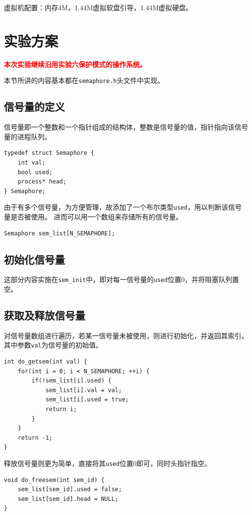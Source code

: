 \documentclass[logo,reportComp]{thesis}
\begin{document}
虚拟机配置：内存4M，1.44M虚拟软盘引导，1.44M虚拟硬盘。

\section{实验方案}
{\textbf{\textcolor{red}{本次实验继续沿用实验六保护模式的操作系统。}}}

本节所讲的内容基本都在\verb'semaphore.h'头文件中实现。

\subsection{信号量的定义}
信号量即一个整数和一个指针组成的结构体，整数是信号量的值，指针指向该信号量的进程队列。
\begin{lstlisting}
typedef struct Semaphore {
    int val;
    bool used;
    process* head;
} Semaphore;
\end{lstlisting}

由于有多个信号量，为方便管理，故添加了一个布尔类型\verb'used'，用以判断该信号量是否被使用。
进而可以用一个数组来存储所有的信号量。
\begin{lstlisting}
Semaphore sem_list[N_SEMAPHORE];
\end{lstlisting}

\subsection{初始化信号量}
这部分内容实施在\verb'sem_init'中，即对每一信号量的\verb'used'位置0，并将阻塞队列置空。

\subsection{获取及释放信号量}
对信号量数组进行遍历，若某一信号量未被使用，则进行初始化，并返回其索引。
其中参数\verb'val'为信号量的初始值。
\begin{lstlisting}
int do_getsem(int val) {
    for(int i = 0; i < N_SEMAPHORE; ++i) {
        if(!sem_list[i].used) {
            sem_list[i].val = val;
            sem_list[i].used = true;
            return i;
        }
    }
    return -1;
}
\end{lstlisting}

释放信号量则更为简单，直接将其\verb'used'位置0即可，同时头指针指空。
\begin{lstlisting}
void do_freesem(int sem_id) {
    sem_list[sem_id].used = false;
    sem_list[sem_id].head = NULL;
}
\end{lstlisting}
\end{document}
